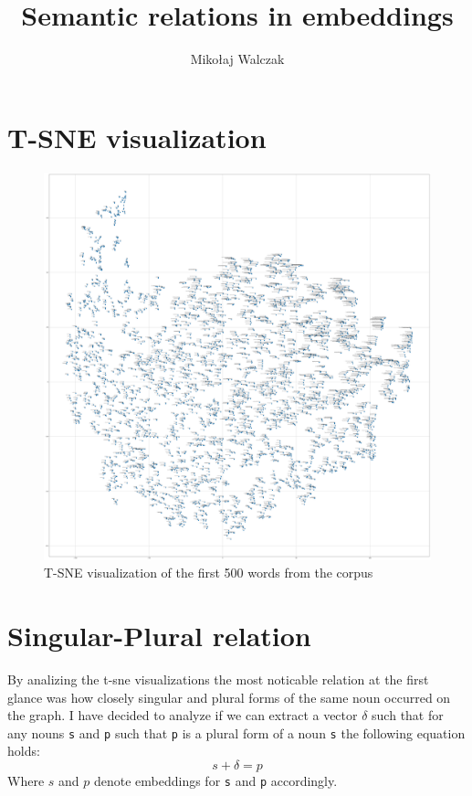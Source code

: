 \documentclass{article}
\author{Mikołaj Walczak}
\title{Semantic relations in embeddings}
\begin{document}
  \maketitle
  \section{T-SNE visualization}
  \begin{figure}[ht]
    \includegraphics[width=\textwidth]{embeddings_500}
    \caption{T-SNE visualization of the first 500 words from the corpus}
    \label{fig:tsne-500}
  \end{figure}

  \section{Singular-Plural relation}
  By analizing the t-sne visualizations the most noticable relation at the first
  glance was how closely singular and plural forms of the same noun occurred on
  the graph. I have decided to analyze if we can extract a vector $\delta$ such that
  for any nouns \texttt{s} and \texttt{p} such that \texttt{p} is a plural
  form of a noun \texttt{s} the following equation holds:
  \begin{equation}
    s + \delta = p
  \end{equation}
  Where $s$ and $p$ denote embeddings for \texttt{s} and \texttt{p} accordingly.
\end{document}
